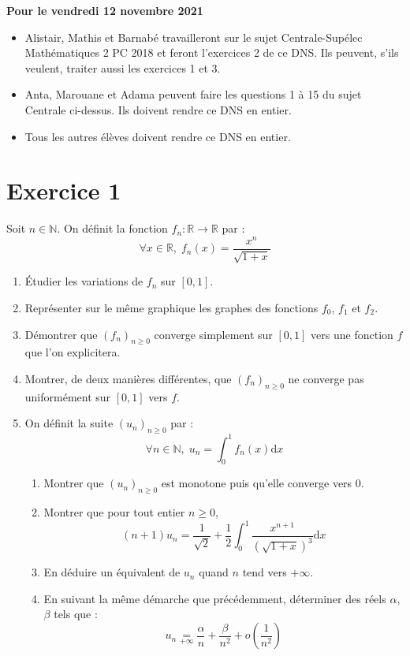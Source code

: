 \documentclass[a4paper,french,11pt,twoside]{VcCours}
\newcommand{\dx}{\text{d}x}
\begin{document}
\begin{center}
\large\bf 
Pour le vendredi 12 novembre 2021
\end{center}
\separationTitre
\vspace{-1.5em}
\begin{itemize}
   \item Alistair, Mathis et Barnabé travailleront sur le sujet Centrale-Supélec Mathématiques 2 PC 2018 et feront l'exercices 2 de ce DNS. Ils peuvent, s'ils veulent, traiter aussi les exercices 1 et 3.
   \item Anta, Marouane et Adama peuvent faire les questions 1 à 15 du sujet Centrale ci-dessus. Ils doivent rendre ce DNS en entier.
   \item Tous les autres élèves doivent rendre ce DNS en entier.
\end{itemize}
\separationTitre
   
\section*{Exercice 1}   
   Soit $n \in \mathbb{N}$. On définit la fonction $f_n : \mathbb{R} \rightarrow \mathbb{R}$ par :
   $$ \forall x \in \mathbb{R}, \; f_n(x) = \dfrac{x^n}{\sqrt{1+x}}$$
   
   \begin{enumerate}
   \item Étudier les variations de $f_n$ sur $[0,1]$.
   \item Représenter sur le même graphique les graphes des fonctions $f_0$, $f_1$ et $f_2$.
   \item Démontrer que $(f_n)_{n \geq 0}$ converge simplement sur $[0,1]$ vers une fonction $f$ que l'on explicitera.
   \item Montrer, de deux manières différentes, que $(f_n)_{n \geq 0}$ ne converge pas uniformément sur $[0,1]$ vers $f$.
   \item On définit la suite $(u_n)_{n \geq 0}$ par :
   $$ \forall n \in \mathbb{N}, \; u_n = \int_0^1 f_n(x) \dx$$
   \begin{enumerate}
   \item Montrer que $(u_n)_{n \geq 0}$ est monotone puis qu'elle converge vers $0$.
   \item Montrer que pour tout entier $n \geq 0$,
   $$ (n+1) u_n = \dfrac{1}{\sqrt{2}} + \dfrac{1}{2} \int_0^1 \dfrac{x^{n+1}}{(\sqrt{1+x})^3} \dx$$
   \item En déduire un équivalent de $u_n$ quand $n$ tend vers $+ \infty$.
   \item En suivant la même démarche que précédemment, déterminer des réels $\alpha$, $\beta$ tels que :
   $$ u_n \underset{+ \infty}{=} \dfrac{\alpha}{n} + \dfrac{\beta}{n^2} + o \left( \dfrac{1}{n^2} \right)$$
   \end{enumerate}
   \end{enumerate}
   
\end{document}

